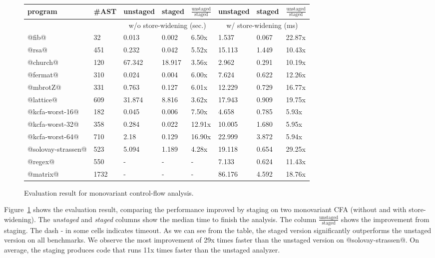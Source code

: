 \begin{figure}[h]
\footnotesize
\begin{tabular}{@{}ll|lll|lll@{}}
\toprule
    program             &\#AST & unstaged   & staged     & $\frac{\text{unstaged}}{\text{staged}}$ & unstaged   & staged    & $\frac{\text{unstaged}}{\text{staged}}$  \\ 
    \midrule
                        &      & \multicolumn{3}{c}{w/o store-widening (sec.)}  &  \multicolumn{3}{c}{w/ store-widening (ms)}\\
    \midrule
    @fib@               & 32   & 0.013      & 0.002      & 6.50x      & 1.537 & 0.067  &  22.87x      \\
    @rsa@               & 451  & 0.232      & 0.042      & 5.52x      & 15.113& 1.449 &  10.43x       \\
    @church@            & 120  & 67.342     & 18.917     & 3.56x      & 2.962 & 0.291 &  10.19x       \\
    @fermat@            & 310  & 0.024      & 0.004      & 6.00x      & 7.624 & 0.622 &  12.26x       \\
    @mbrotZ@            & 331  & 0.763      & 0.127      & 6.01x      & 12.229& 0.729 &  16.77x       \\
    @lattice@           & 609  & 31.874     & 8.816      & 3.62x      & 17.943& 0.909 &  19.75x       \\
    @kcfa-worst-16@     & 182  & 0.045      & 0.006      & 7.50x      & 4.658 & 0.785 &  5.93x        \\
    @kcfa-worst-32@     & 358  & 0.284      & 0.022      & 12.91x     & 10.005& 1.680 &  5.95x        \\
    @kcfa-worst-64@     & 710  & 2.18       & 0.129      & 16.90x     & 22.999& 3.872 &  5.94x        \\
    @solovay-strassen@  & 523  & 5.094      & 1.189      & 4.28x      & 19.118& 0.654 &  29.25x       \\
    @regex@             & 550  & -          & -          & -          & 7.133 & 0.624 &  11.43x       \\
    @matrix@            & 1732 & -          & -          & -          & 86.176& 4.592 &  18.76x       \\
    \bottomrule
\end{tabular}
\caption{Evaluation result for monovariant control-flow analysis.} \label{evaluation_result}
\end{figure}

Figure~\ref{evaluation_result} shows the evaluation result, comparing the
performance improved by staging on two monovariant CFA (without and with store-widening). The
\textit{unstaged} and \textit{staged} columns show the median time to finish the
analysis. The column $\frac{\text{unstaged}}{\text{staged}}$
shows the improvement from staging. The dash - in some cells indicates timeout.
As we can see from the table, the staged version significantly outperforms the
unstaged version on all benchmarks.
We observe the most improvement of 29x times faster than the unstaged version on
@solovay-strassen@. On average, the staging produces code that runs 11x times faster
than the unstaged analyzer.

